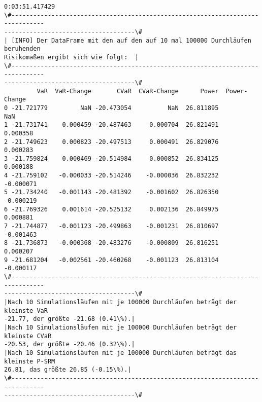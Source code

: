 \documentclass[paper=landscape]{scrartcl}
\begin{document}
\begin{Verbatim}[commandchars=\\\{\}]
0:03:51.417429
\#-------------------------------------------------------------------------------
------------------------------------\#
| [INFO] Der DataFrame mit den auf den auf 10 mal 100000 Durchläufen beruhenden
Risikomaßen ergibt sich wie folgt:  |
\#-------------------------------------------------------------------------------
------------------------------------\#
         VaR  VaR-Change       CVaR  CVaR-Change      Power  Power-Change
0 -21.721779         NaN -20.473054          NaN  26.811895           NaN
1 -21.731741    0.000459 -20.487463     0.000704  26.821491      0.000358
2 -21.749623    0.000823 -20.497513     0.000491  26.829076      0.000283
3 -21.759824    0.000469 -20.514984     0.000852  26.834125      0.000188
4 -21.759102   -0.000033 -20.514246    -0.000036  26.832232     -0.000071
5 -21.734240   -0.001143 -20.481392    -0.001602  26.826350     -0.000219
6 -21.769326    0.001614 -20.525132     0.002136  26.849975      0.000881
7 -21.744877   -0.001123 -20.499863    -0.001231  26.810697     -0.001463
8 -21.736873   -0.000368 -20.483276    -0.000809  26.816251      0.000207
9 -21.681204   -0.002561 -20.460268    -0.001123  26.813104     -0.000117
\#-------------------------------------------------------------------------------
------------------------------------\#
|Nach 10 Simulationsläufen mit je 100000 Durchläufen beträgt der kleinste VaR
-21.77, der größte -21.68 (0.41\%).|
|Nach 10 Simulationsläufen mit je 100000 Durchläufen beträgt der kleinste CVaR
-20.53, der größte -20.46 (0.32\%).|
|Nach 10 Simulationsläufen mit je 100000 Durchläufen beträgt das kleinste P-SRM
26.81, das größte 26.85 (-0.15\%).|
\#-------------------------------------------------------------------------------
------------------------------------\#
    \end{Verbatim}


    
    
    
\end{document}
